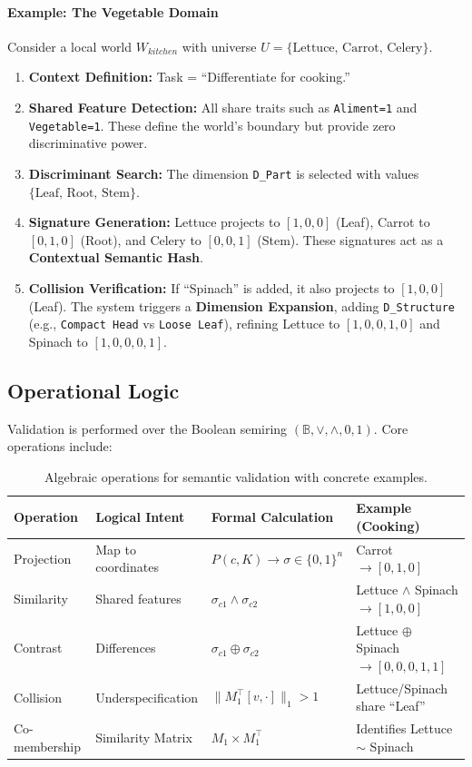 \documentclass{article}
\begin{document}
\paragraph{Example: The Vegetable Domain} Consider a local world $W_{kitchen}$ with universe $U = \{ \text{Lettuce, Carrot, Celery} \}$.
\begin{enumerate}
    \item \textbf{Context Definition:} Task = ``Differentiate for cooking.''
    \item \textbf{Shared Feature Detection:} All share traits such as \texttt{Aliment=1} and \texttt{Vegetable=1}. These define the world's boundary but provide zero discriminative power.
    \item \textbf{Discriminant Search:} The dimension \texttt{D\_Part} is selected with values $\{\text{Leaf, Root, Stem}\}$.
    \item \textbf{Signature Generation:} Lettuce projects to $[1, 0, 0]$ (Leaf), Carrot to $[0, 1, 0]$ (Root), and Celery to $[0, 0, 1]$ (Stem). These signatures act as a \textbf{Contextual Semantic Hash}.
    \item \textbf{Collision Verification:} If ``Spinach'' is added, it also projects to $[1, 0, 0]$ (Leaf). The system triggers a \textbf{Dimension Expansion}, adding \texttt{D\_Structure} (e.g., \texttt{Compact Head} vs \texttt{Loose Leaf}), refining Lettuce to $[1, 0, 0, 1, 0]$ and Spinach to $[1, 0, 0, 0, 1]$.
\end{enumerate}

\subsection{Operational Logic}
Validation is performed over the Boolean semiring $(\mathbb{B}, \vee, \wedge, 0, 1)$. Core operations include:

\begin{table}[h]
  \centering
  \begin{tabular}{llll}
    \toprule
    Operation & Logical Intent & Formal Calculation & Example (Cooking) \\
    \midrule
    Projection & Map to coordinates & $P(c, K) \to \sigma \in \{0, 1\}^n$ & Carrot $\to [0, 1, 0]$ \\
    Similarity & Shared features & $\sigma_{c1} \wedge \sigma_{c2}$ & Lettuce $\wedge$ Spinach $\to [1, 0, 0]$ \\
    Contrast & Differences & $\sigma_{c1} \oplus \sigma_{c2}$ & Lettuce $\oplus$ Spinach $\to [0, 0, 0, 1, 1]$ \\
    Collision & Underspecification & $\|M_1^\intercal[v, \cdot]\|_1 > 1$ & Lettuce/Spinach share ``Leaf'' \\
    Co-membership & Similarity Matrix & $M_1 \times M_1^\intercal$ & Identifies Lettuce $\sim$ Spinach \\
    \bottomrule
  \end{tabular}
  \caption{Algebraic operations for semantic validation with concrete examples.}
\end{table}
\end{document}
